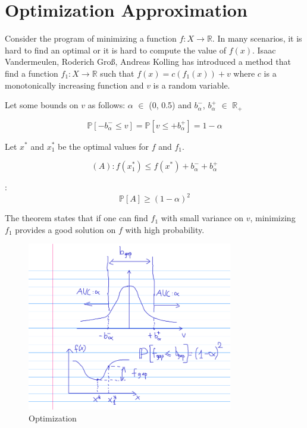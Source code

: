 \section{Optimization Approximation}

Consider the program of minimizing a function $f: X \to \mathbb{R}$. In many scenarios, it is hard to find an optimal or it is hard to compute the value of $f(x)$. Isaac Vandermeulen, Roderich Groß, Andreas Kolling \cite{vandermeulen2019balanced} has introduced a method that find a function $f_1: X \to \mathbb{R}$ such that $f(x) = c(f_1(x)) + v$ where $c$ is a monotonically increasing function and $v$ is a random variable. 

Let some bounds on $v$ as follows: $\alpha$ $\in$ (0, 0.5) and $b_\alpha^-$, $b_\alpha^+$ $\in$ $\mathbb{R}_+$

\[
\mathbb{P}[-b_\alpha^- \leq v] = \mathbb{P}[v \leq +b_\alpha^+] = 1 - \alpha
\]

Let $x^*$ and $x^*_1$ be the optimal values for $f$ and $f_1$.

\[
(A): f(x^*_1) \leq f(x^*) + b_\alpha^- + b_\alpha^+
\]

\begin{theorem}[Approximation]:
\[
\mathbb{P}[A] \geq (1 - \alpha)^2
\]
\end{theorem}

The theorem states that if one can find $f_1$ with small variance on $v$, minimizing $f_1$ provides a good solution on $f$ with high probability.

\begin{figure}[h!]
\centering
\includegraphics[width=0.8\textwidth]{assets/optimization.png}
\caption{Optimization}
\label{fig:optimization}
\end{figure}





